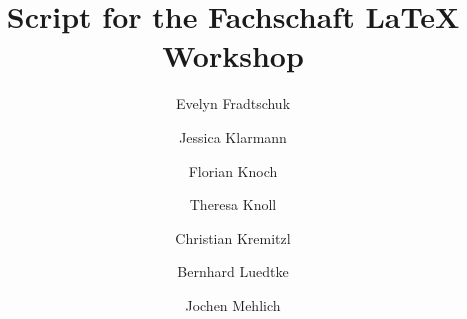 
\title{Script for the Fachschaft  \LaTeX{} Workshop}
\author{Evelyn Fradtschuk \and Jessica Klarmann \and Florian Knoch \and Theresa Knoll \and Christian Kremitzl \and Bernhard Luedtke \and Jochen Mehlich}
 

\frenchspacing

\renewcommand{\thesection}{E\arabic{section}}
\renewcommand{\thesubsection}{\arabic{subsection}}


\thispagestyle{empty}
\newpage
\setcounter{page}{1} %
\setcounter{tocdepth}{2}
\tableofcontents
\newpage



\setcounter{section}{2}




\newpage



\newpage



\newpage



\newpage



\newpage



\newpage



\newpage



\newpage



\newpage



\newpage



\newpage




